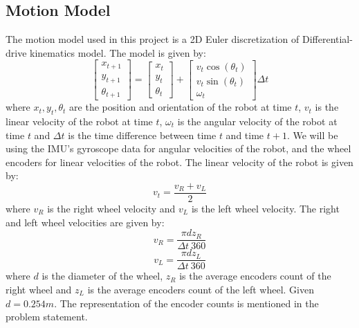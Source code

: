 \documentclass[a4paper]{article}
\begin{document}
\subsection{Motion Model}
The motion model used in this project is a 2D Euler discretization of Differential-drive kinematics model. The model is given by:
\begin{equation}
\begin{bmatrix}
x_{t+1} \\
y_{t+1} \\
\theta_{t+1}
\end{bmatrix} = \begin{bmatrix}
x_t \\
y_t \\
\theta_t
\end{bmatrix} + \begin{bmatrix}
v_t \cos(\theta_t) \\
v_t \sin(\theta_t) \\
\omega_t
\end{bmatrix} \Delta t
\end{equation}
where $x_t, y_t, \theta_t$ are the position and orientation of the robot at time $t$, $v_t$ is the linear velocity of the robot at time $t$, $\omega_t$ is the angular velocity of the robot at time $t$ and $\Delta t$ is the time difference between time $t$ and time $t+1$. We will be using the IMU's gyroscope data for angular velocities of the robot, and the wheel encoders for linear velocities of the robot. The linear velocity of the robot is given by:
\begin{equation}
v_t = \frac{v_R + v_L}{2}
\end{equation}
where $v_R$ is the right wheel velocity and $v_L$ is the left wheel velocity. The right and left wheel velocities are given by:
\begin{equation}
v_R = \frac{\pi dz_{R}}{\Delta t \ 360}
\end{equation}
\begin{equation}
v_L = \frac{\pi dz_{L}}{\Delta t \ 360}
\end{equation}
where $d$ is the diameter of the wheel, $z_{R}$ is the average encoders count of the right wheel and $z_{L}$ is the average encoders count of the left wheel. Given $d = 0.254m$. The representation of the encoder counts is mentioned in the problem statement. 
\end{document}
